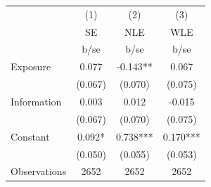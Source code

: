 {
\def\sym#1{\ifmmode^{#1}\else\(^{#1}\)\fi}
\begin{tabular}{l*{3}{c}}
\hline\hline
                    &\multicolumn{1}{c}{(1)}&\multicolumn{1}{c}{(2)}&\multicolumn{1}{c}{(3)}\\
                    &\multicolumn{1}{c}{SE}&\multicolumn{1}{c}{NLE}&\multicolumn{1}{c}{WLE}\\
                    &        b/se   &        b/se   &        b/se   \\
\hline
Exposure            &       0.077   &      -0.143** &       0.067   \\
                    &     (0.067)   &     (0.070)   &     (0.075)   \\
Information         &       0.003   &       0.012   &      -0.015   \\
                    &     (0.067)   &     (0.070)   &     (0.075)   \\
Constant            &       0.092*  &       0.738***&       0.170***\\
                    &     (0.050)   &     (0.055)   &     (0.053)   \\
\hline
Observations        &        2652   &        2652   &        2652   \\
\hline\hline
\end{tabular}
}
